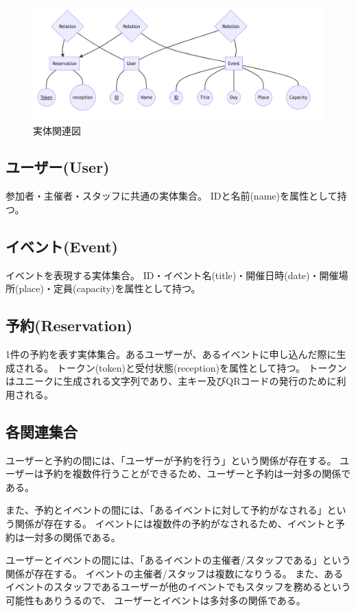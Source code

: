 \documentclass[dvipdfmx]{jarticle}
\begin{document}
\begin{figure}[H]
    \centering
    \includegraphics[scale=0.5]{ermodel.png}
    \caption{実体関連図}
\end{figure}

\subsection{ユーザー(User)}
参加者・主催者・スタッフに共通の実体集合。
IDと名前(name)を属性として持つ。

\subsection{イベント(Event)}
イベントを表現する実体集合。
ID・イベント名(title)・開催日時(date)・開催場所(place)・定員(capacity)を属性として持つ。

\subsection{予約(Reservation)}
1件の予約を表す実体集合。あるユーザーが、あるイベントに申し込んだ際に生成される。
トークン(token)と受付状態(reception)を属性として持つ。
トークンはユニークに生成される文字列であり、主キー及びQRコードの発行のために利用される。

\subsection{各関連集合}
ユーザーと予約の間には、「ユーザーが予約を行う」という関係が存在する。
ユーザーは予約を複数件行うことができるため、ユーザーと予約は一対多の関係である。

また、予約とイベントの間には、「あるイベントに対して予約がなされる」という関係が存在する。
イベントには複数件の予約がなされるため、イベントと予約は一対多の関係である。

ユーザーとイベントの間には、「あるイベントの主催者/スタッフである」という関係が存在する。
イベントの主催者/スタッフは複数になりうる。
また、あるイベントのスタッフであるユーザーが他のイベントでもスタッフを務めるという可能性もありうるので、
ユーザーとイベントは多対多の関係である。
\end{document}
